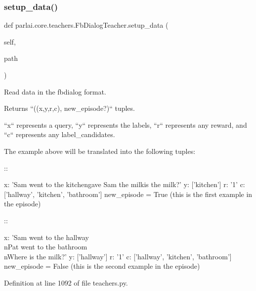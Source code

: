 \mbox{\label{classparlai_1_1core_1_1teachers_1_1FbDialogTeacher_a6cb23867e396fac5fdcde509b5da3942}} 
\subsubsection{\texorpdfstring{setup\+\_\+data()}{setup\_data()}}
{\footnotesize\ttfamily def parlai.\+core.\+teachers.\+Fb\+Dialog\+Teacher.\+setup\+\_\+data (\begin{DoxyParamCaption}\item[{}]{self,  }\item[{}]{path }\end{DoxyParamCaption})}

\begin{DoxyVerb}Read data in the fbdialog format.

Returns ``((x,y,r,c), new_episode?)`` tuples.

``x`` represents a query, ``y`` represents the labels, ``r`` represents
any reward, and ``c`` represents any label_candidates.

The example above will be translated into the following tuples:

::

    x: 'Sam went to the kitchen\nPat gave Sam the milk\nWhere is the milk?'
    y: ['kitchen']
    r: '1'
    c: ['hallway', 'kitchen', 'bathroom']
    new_episode = True (this is the first example in the episode)


::

    x: 'Sam went to the hallway\\nPat went to the bathroom\\nWhere is the
milk?'
    y: ['hallway']
    r: '1'
    c: ['hallway', 'kitchen', 'bathroom']
    new_episode = False (this is the second example in the episode)
\end{DoxyVerb}
 

Definition at line 1092 of file teachers.\+py.


